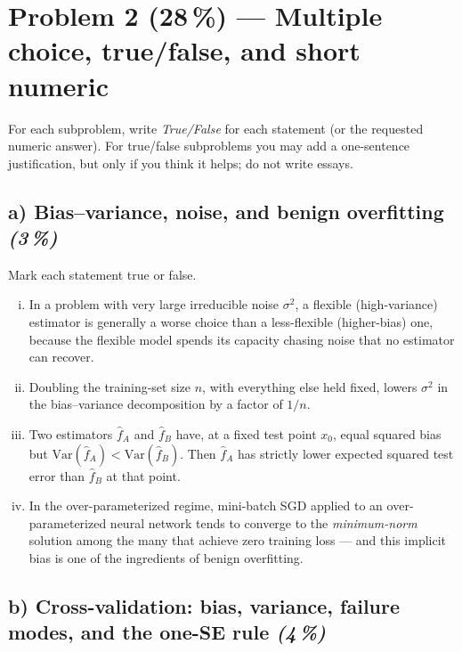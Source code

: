 \documentclass[11pt,a4paper]{article}
\newcommand{\points}[1]{\textbf{(#1\,\%)}}
\newcommand{\subpoints}[1]{\textit{(#1\,\%)}}
\begin{document}
\section*{Problem 2 \points{28} --- Multiple choice, true/false, and short numeric}

For each subproblem, write \emph{True/False} for each statement (or the requested numeric answer). For true/false subproblems you may add a one-sentence justification, but only if you think it helps; do not write essays.

\subsection*{a) Bias--variance, noise, and benign overfitting \subpoints{3}}
Mark each statement true or false.
\begin{enumerate}[(i)]
  \item In a problem with very large irreducible noise $\sigma^2$, a flexible (high-variance) estimator is generally a worse choice than a less-flexible (higher-bias) one, because the flexible model spends its capacity chasing noise that no estimator can recover.
  \item Doubling the training-set size $n$, with everything else held fixed, lowers $\sigma^2$ in the bias--variance decomposition by a factor of $1/n$.
  \item Two estimators $\hat f_A$ and $\hat f_B$ have, at a fixed test point $x_0$, equal squared bias but $\mathrm{Var}(\hat f_A) < \mathrm{Var}(\hat f_B)$. Then $\hat f_A$ has strictly lower expected squared test error than $\hat f_B$ at that point.
  \item In the over-parameterized regime, mini-batch SGD applied to an over-parameterized neural network tends to converge to the \emph{minimum-norm} solution among the many that achieve zero training loss --- and this implicit bias is one of the ingredients of benign overfitting.
\end{enumerate}

\subsection*{b) Cross-validation: bias, variance, failure modes, and the one-SE rule \subpoints{4}}
\end{document}
